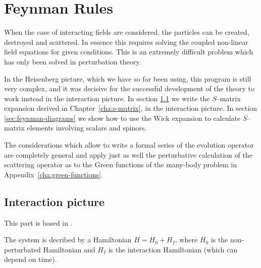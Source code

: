 \chapter{Feynman Rules}
\label{chap:fr} %

When the case of interacting fields are considered, the particles can be created, destroyed and scattered. In essence this requires solving the coupled non-linear field equations for given conditions. This is an extremely difficult problem which has only been solved in perturbation theory.

In the Heisenberg picture, which we have so far been using, this program is still very complex, and it was decisive for the successful development of the theory to work instead in the interaction picture. In section \ref{sec:interaction-picture} we write the $S$--matrix expansion derived in Chapter~\ref{cha:s-matrix}, in the interaction picture. In section \ref{sec:feynman-diagrams} we show how to use the Wick expansion to calculate $S$--matrix elements involving scalars and spinors.

The considerations which allow to write a formal series of the
evolution operator are completely general and apply just as well the
perturbative calculation of the scattering operator as to the Green
functions of the many-body problem in Appendix~\ref{cha:green-functions}.


\section{Interaction picture}
\label{sec:interaction-picture}
This part is based in \cite{Mandl:1985bg}. 

The system is decribed by a Hamiltonian $H=H_0+H_I$, where $H_{0}$ is the non-perturbated Hamiltonian and $H_I$ is the interaction Hamiltonian (which can depend on time). 

